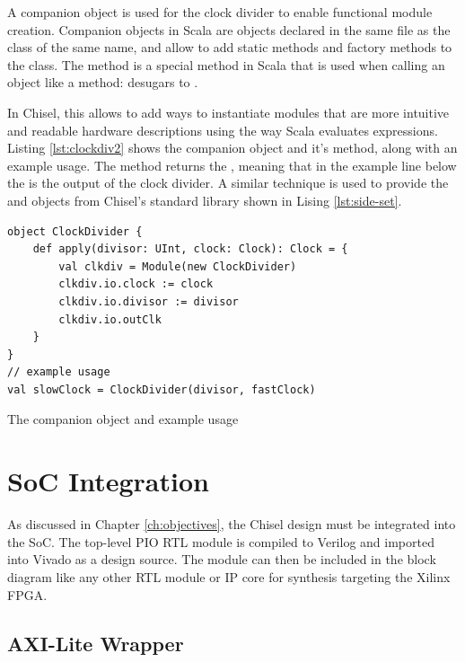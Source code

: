 A companion object is used for the clock divider to enable functional module creation. Companion objects in Scala are objects declared in the same file as the class of the same name, and allow to add static methods and factory methods to the class. The  method is a special method in Scala that is used when calling an object like a method:  desugars to  \cite{scala_book}.

In Chisel, this allows to add ways to instantiate modules that are more intuitive and readable hardware descriptions using the way Scala evaluates expressions. Listing \ref{lst:clockdiv2} shows the  companion object and it's  method, along with an example usage. The method returns the , meaning that in the example line below the  is the output of the clock divider. A similar technique is used to provide the  and  objects from Chisel's standard library shown in Lising \ref{lst:side-set}.

\begin{listing}[h!]
    \centering
    \vspace{0.5cm}
    \begin{verbatim}
object ClockDivider {
    def apply(divisor: UInt, clock: Clock): Clock = {
        val clkdiv = Module(new ClockDivider)
        clkdiv.io.clock := clock
        clkdiv.io.divisor := divisor
        clkdiv.io.outClk
    }
}
// example usage
val slowClock = ClockDivider(divisor, fastClock)
    \end{verbatim}
    \caption{The  companion object and example usage}
    \label{lst:clockdiv2}
\end{listing}

\section{SoC Integration}

As discussed in Chapter \ref{ch:objectives}, the Chisel design must be integrated into the SoC. The top-level PIO RTL module is compiled to Verilog and imported into Vivado as a design source. The module can then be included in the block diagram like any other RTL module or IP core for synthesis targeting the Xilinx FPGA.

\subsection{AXI-Lite Wrapper}

